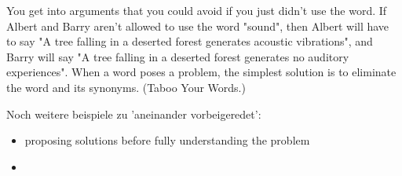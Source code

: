 \begin{frame}[c]
    You get into arguments that you could avoid if you just didn't use the word. If Albert and Barry aren't allowed to use the word "sound", then Albert will have to say "A tree falling in a deserted forest generates acoustic vibrations", and Barry will say "A tree falling in a deserted forest generates no auditory experiences".  When a word poses a problem, the simplest solution is to eliminate the word and its synonyms.  (Taboo Your Words.)
\end{frame}


\begin{frame}[c]
    Noch weitere beispiele zu 'aneinander vorbeigeredet':
    \begin{itemize}[<+(1)->]
        \item proposing solutions before fully understanding the problem
        \item 
    \end{itemize}
\end{frame}


